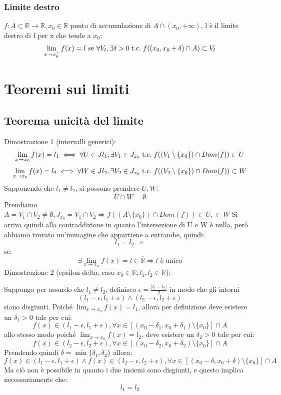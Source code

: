 \documentclass[a4paper, 12pt, openany]{book}
\begin{document}
	 \subsubsection{Limite destro}
	 $f: A \subset \mathbb{R} \longrightarrow \mathbb{R}, x_0 \in \mathbb{R}$ punto di accumulazione di $ A \cap(x_0, +\infty)$, l è il limite destro di f per x che tende a $x_0$:
	 \[\lim_{x \rightarrow x_0^+} f(x) = l \text{ se } \forall V_l, \exists \delta > 0 \;\text{t.c.}\; f((x_0, x_0 + \delta) \cap A) \subset V_l\]
	 
	 \section{Teoremi sui limiti}
	 \subsection{Teorema unicità del limite}
	 Dimostrazione 1 (intervalli generici):
	 \[\lim_{x \rightarrow x_0} f(x) = l_1 \iff \forall U \in Jl_1, \exists V_1 \in J_{x_0} \;\text{t.c.}\; f((V_1 \setminus \{x_0\}) \cap Dom(f)) \subset U\]
	 \[\lim_{x \rightarrow x_0} f(x) = l_2 \iff \forall W \in Jl_2, \exists V_2 \in J_{x_0} \;\text{t.c.}\; f((V_2 \setminus \{x_0\}) \cap Dom(f)) \subset W\]
	 Supponendo che $l_1 \not = l_2$, si possono prendere $U, W$:
	 \[U \cap W = \emptyset\]
	 Prendiamo $A = V_1 \cap V_2 \not = \emptyset, J_{x_0} = V_1 \cap V_2 \Rightarrow f((A \setminus \{x_0\}) \cap Dom(f)) \subset U, \subset W$ 
	 Si arriva quindi alla contraddizione in quanto l'intersezione di U e W è nulla, però abbiamo trovato un'immagine che appartiene a entrambe, quindi:
	 \[l_1 = l_2 \Rightarrow \]
	 se:
	 \[\exists \lim_{x \rightarrow x_0} f(x) = l \in \overline{\mathbb{R}} \Rightarrow l \text{ è unico}\]
	 Dimostrazione 2 (epsilon-delta, caso $x_0 \in \mathbb{R}, l_1,l_2 \in \mathbb{R}$):
	 
	 Suppongo per assurdo che $l_1 \not = l_2$, definisco $\epsilon = \frac{|l_1 - l_2|}{2}$ in modo che gli intorni
	 \[(l_1 - \epsilon, l_1 + \epsilon) \wedge (l_2 - \epsilon, l_2 + \epsilon)\]
	 siano disgiunti.
	 Poiché $\lim_{x \rightarrow x_0} f(x) = l_1$, allora per definizione deve esistere un $\delta_1 > 0$ tale per cui:
	 \[f(x) \in (l_1 - \epsilon, l_1 + \epsilon), \forall x \in [(x_0 - \delta_1, x_0 + \delta_1)\setminus\{x_0\}] \cap A\]
	 allo stesso modo poiché  $\lim_{x \rightarrow x_0} f(x) = l_2$, deve esistere un $\delta_2 > 0$ tale per cui:
	 \[f(x) \in (l_2 - \epsilon, l_2 + \epsilon), \forall x \in [(x_0 - \delta_2, x_0 + \delta_2)\setminus\{x_0\}] \cap A\]
	 Prendendo quindi $\delta = \min\{\delta_1, \delta_2\}$ allora:
	 \[f(x) \in (l_1 - \epsilon, l_1 + \epsilon) \wedge f(x) \in (l_2 - \epsilon, l_2 + \epsilon), \forall x \in [(x_0 - \delta, x_0 + \delta)\setminus\{x_0\}] \cap A\]
	 Ma ciò non è possibile in quanto i due insiemi sono disgiunti, e questo implica necessariamente che:
	 \[l_1 = l_2\]
\end{document}
